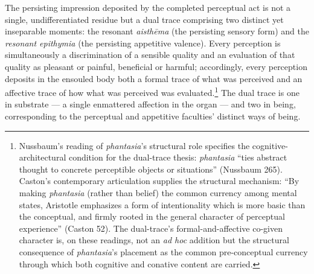 \documentclass{article}
\begin{document}
The persisting impression deposited by the completed perceptual act is not a single, undifferentiated residue but a dual trace comprising two distinct yet inseparable moments: the resonant \textit{aisthēma} (the persisting sensory form) and the \textit{resonant epithymia} (the persisting appetitive valence). Every perception is simultaneously a discrimination of a sensible quality and an evaluation of that quality as pleasant or painful, beneficial or harmful; accordingly, every perception deposits in the ensouled body both a formal trace of what was perceived and an affective trace of how what was perceived was evaluated.\footnote{Nussbaum's reading of \textit{phantasia}'s structural role specifies the cognitive-architectural condition for the dual-trace thesis: \textit{phantasia} ``ties abstract thought to concrete perceptible objects or situations'' (Nussbaum 265). Caston's contemporary articulation supplies the structural mechanism: ``By making \textit{phantasia} (rather than belief) the common currency among mental states, Aristotle emphasizes a form of intentionality which is more basic than the conceptual, and firmly rooted in the general character of perceptual experience'' (Caston 52). The dual-trace's formal-and-affective co-given character is, on these readings, not an \textit{ad hoc} addition but the structural consequence of \textit{phantasia}'s placement as the common pre-conceptual currency through which both cognitive and conative content are carried.} The dual trace is one in substrate --- a single enmattered affection in the organ --- and two in being, corresponding to the perceptual and appetitive faculties' distinct ways of being.
\end{document}

